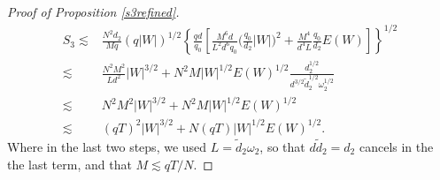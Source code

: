 \begin{proof}[Proof of Proposition \ref{s3refined}]
\begin{align*}
        S_3\lesssim &\frac{N^2 d_2}{Mq} (q|W|)^{1/2}  \left\{\frac{qd}{q_0}\left[\frac{M^6d}{L^2d^6q_0}\Big(\frac{q_0}{d_2}|W|)^2  + \frac{M^4}{d^4L}\frac{q_0}{d_2}E(W)\right]\right\}^{1/2}\\
        \lesssim& \frac{N^2M^2}{Ld^2}|W|^{3/2} + N^2M|W|^{1/2}E(W)^{1/2}\frac{d_2^{1/2}}{d^{3/2}\tilde{d}_2^{1/2}\omega_2^{1/2}}\\
        \lesssim& N^2M^2|W|^{3/2} + N^2M|W|^{1/2}E(W)^{1/2}\\
        \lesssim& (qT)^2|W|^{3/2} + N(qT)|W|^{1/2}E(W)^{1/2}.
    \end{align*}
    Where in the last two steps, we used $L=\tilde{d}_2\omega_2$, so that $d\tilde{d}_2=d_2$ cancels in the the last term, and that $M\lesssim qT/N$.
\end{proof}